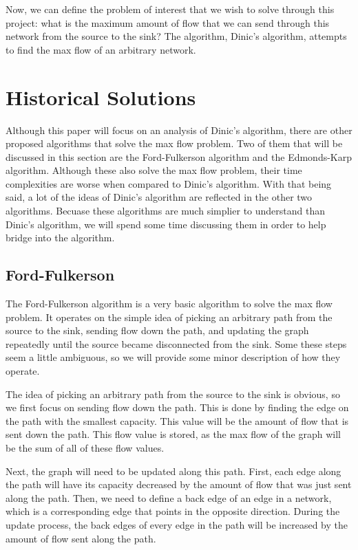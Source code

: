 \documentclass{report}
\begin{document}
Now, we can define the problem of interest that we wish to solve through this project: what is the maximum amount of flow that we can send through this network from the source to the sink? The algorithm, Dinic's algorithm, attempts to find the max flow of an arbitrary network.

\chapter{Historical Solutions}
Although this paper will focus on an analysis of Dinic's algorithm, there are other proposed algorithms that solve the max flow problem. Two of them that will be discussed in this section are the Ford-Fulkerson algorithm and the Edmonds-Karp algorithm. Although these also solve the max flow problem, their time complexities are worse when compared to Dinic's algorithm. With that being said, a lot of the ideas of Dinic's algorithm are reflected in the other two algorithms. Becuase these algorithms are much simplier to understand than Dinic's algorithm, we will spend some time discussing them in order to help bridge into the algorithm.

\section{Ford-Fulkerson}
The Ford-Fulkerson algorithm is a very basic algorithm to solve the max flow problem. It operates on the simple idea of picking an arbitrary path from the source to the sink, sending flow down the path, and updating the graph repeatedly until the source became disconnected from the sink. Some these steps seem a little ambiguous, so we will provide some minor description of how they operate.

The idea of picking an arbitrary path from the source to the sink is obvious, so we first focus on sending flow down the path. This is done by finding the edge on the path with the smallest capacity. This value will be the amount of flow that is sent down the path. This flow value is stored, as the max flow of the graph will be the sum of all of these flow values.

Next, the graph will need to be updated along this path. First, each edge along the path will have its capacity decreased by the amount of flow that was just sent along the path. Then, we need to define a back edge of an edge in a network, which is a corresponding edge that points in the opposite direction. During the update process, the back edges of every edge in the path will be increased by the amount of flow sent along the path.
\end{document}
